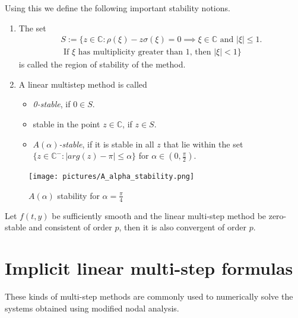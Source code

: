 	Using this we define the following important stability notions.
	\begin{definition}
		\begin{enumerate}
			\item 
			The set
			\begin{equation}
				\begin{aligned}
					S := \{z \in \mathbb{C} : \rho(\xi) - z \sigma(\xi) = 0 \implies \xi \in \mathbb{C} \text{ and } |\xi| \leq 1. \\
					\text{ If $\xi$ has multiplicity greater than $1$, then } |\xi| < 1\}
				\end{aligned}
			\end{equation}
			is called the region of stability of the method.
			\item 
			A linear multistep method is called
			\begin{itemize}
				\item \emph{0-stable}, if $0 \in S$.
				\item stable in the point $z \in \mathbb{C}$, if $z \in S$.
				\item \emph{$A(\alpha)$-stable}, if it is stable in all $z$ that lie within the set $\{z \in \mathbb{C}^- : |arg(z)-\pi| \leq \alpha\}$ for $\alpha \in (0, \frac{\pi}{2})$.		 
			\end{itemize}
		\end{enumerate}
	\end{definition}
	
	
	\begin{figure}[H]
		\centering
		\texttt{[image: pictures/A\_alpha\_stability.png]}
		\caption{$A(\alpha)$ stability for $\alpha = \frac{\pi}{4}$}
		\label{fig:A of alpha stability}
	\end{figure}
	
	\begin{theorem}
		\label{th: null-stbaility and consistence is convergence}
		Let $f(t,y)$ be sufficiently smooth and the linear multi-step method be zero-stable and consistent of order $p$, then it is also convergent of order $p$.
	\end{theorem}
	
	
\section{Implicit linear multi-step formulas}
These kinds of multi-step methods are commonly used to numerically solve the systems obtained using modified nodal analysis.

